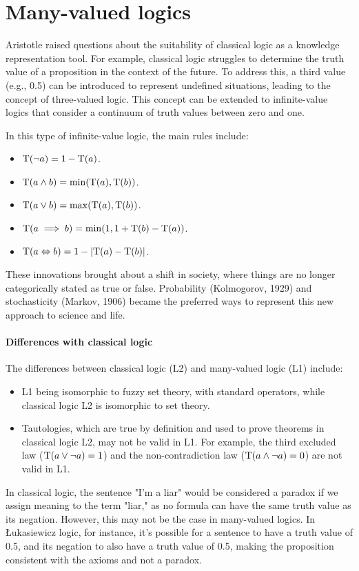 \section{Many-valued logics}

Aristotle raised questions about the suitability of classical logic as a knowledge representation tool.
For example, classical logic struggles to determine the truth value of a proposition in the context of the future.
To address this, a third value (e.g., 0.5) can be introduced to represent undefined situations, leading to the concept of three-valued logic. 
This concept can be extended to infinite-value logics that consider a continuum of truth values between zero and one.
\begin{example}
    In this type of infinite-value logic, the main rules include:
    \begin{itemize}
        \item $\textnormal{T}(\lnot a)=1-\textnormal{T}(a)$.
        \item $\textnormal{T}(a \land b)=\min (\textnormal{T}(a),\textnormal{T}(b))$.
        \item $\textnormal{T}(a \lor b)=\max (\textnormal{T}(a),\textnormal{T}(b))$.
        \item $\textnormal{T}(a \implies b)=\min (1, 1+\textnormal{T}(b)-\textnormal{T}(a))$.
        \item $\textnormal{T}(a \Leftrightarrow b)=1-\left\lvert \textnormal{T}(a)-\textnormal{T}(b) \right\rvert$.
    \end{itemize}
\end{example}
These innovations brought about a shift in society, where things are no longer categorically stated as true or false. 
Probability (Kolmogorov, 1929) and stochasticity (Markov, 1906) became the preferred ways to represent this new approach to science and life.

\paragraph*{Differences with classical logic}
The differences between classical logic (L2) and many-valued logic (L1) include:
\begin{itemize}
    \item L1 being isomorphic to fuzzy set theory, with standard operators, while classical logic L2 is isomorphic to set theory.
    \item Tautologies, which are true by definition and used to prove theorems in classical logic L2, may not be valid in L1. 
        For example, the third excluded law ($\textnormal{T}(a \lor \lnot a)=1$) and the non-contradiction law ($\textnormal{T}(a \land \lnot a)=0$) are not valid in L1.
\end{itemize}
In classical logic, the sentence "I'm a liar" would be considered a paradox if we assign meaning to the term "liar," as no formula can have the same truth value as its negation. 
However, this may not be the case in many-valued logics. In Łukasiewicz logic, for instance, it's possible for a sentence to have a truth value of 0.5, and its negation to also have a truth value of 0.5, making the proposition consistent with the axioms and not a paradox.